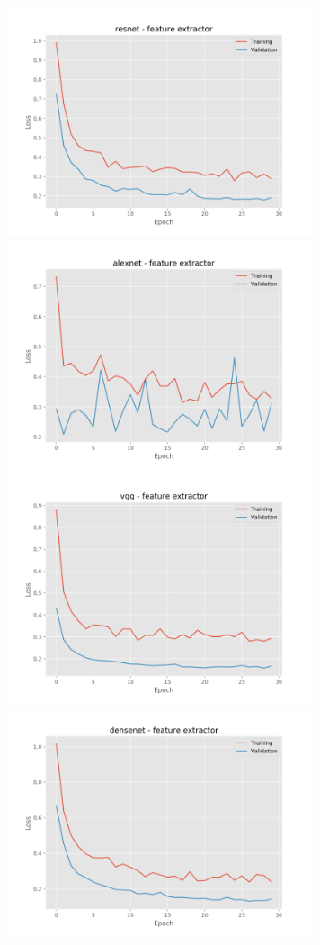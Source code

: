 \documentclass[]{kththesis}
\begin{document}
  \begin{figure}[h]
    \includegraphics[width=9cm]{r_l_resnet_fe}
    \includegraphics[width=9cm]{r_l_alexnet_fe}
    \includegraphics[width=9cm]{r_l_vgg_fe}
    \includegraphics[width=9cm]{r_l_densenet_fe}

\end{figure}
\end{document}
